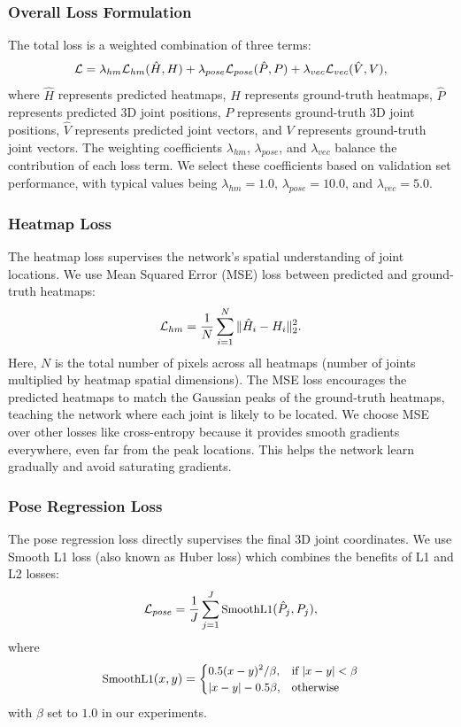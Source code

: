 \subsubsection{Overall Loss Formulation}
The total loss is a weighted combination of three terms:
\begin{equation}
\small
\mathcal{L} = \lambda_{hm}\mathcal{L}_{hm}(\hat{H}, H)
+ \lambda_{pose}\mathcal{L}_{pose}(\hat{P}, P)
+ \lambda_{vec}\mathcal{L}_{vec}(\hat{V}, V),
\end{equation}
where \(\hat{H}\) represents predicted heatmaps, \(H\) represents ground-truth heatmaps, \(\hat{P}\) represents predicted 3D joint positions, \(P\) represents ground-truth 3D joint positions, \(\hat{V}\) represents predicted joint vectors, and \(V\) represents ground-truth joint vectors. The weighting coefficients \(\lambda_{hm}\), \(\lambda_{pose}\), and \(\lambda_{vec}\) balance the contribution of each loss term. We select these coefficients based on validation set performance, with typical values being \(\lambda_{hm}=1.0\), \(\lambda_{pose}=10.0\), and \(\lambda_{vec}=5.0\).

\subsubsection{Heatmap Loss}
The heatmap loss supervises the network's spatial understanding of joint locations. We use Mean Squared Error (MSE) loss between predicted and ground-truth heatmaps:
\begin{equation}
\small
\mathcal{L}_{hm} = \frac{1}{N}\sum_{i=1}^{N} \|\hat{H}_i - H_i\|_2^2 .
\end{equation}
Here, \(N\) is the total number of pixels across all heatmaps (number of joints multiplied by heatmap spatial dimensions). The MSE loss encourages the predicted heatmaps to match the Gaussian peaks of the ground-truth heatmaps, teaching the network where each joint is likely to be located.
We choose MSE over other losses like cross-entropy because it provides smooth gradients everywhere, even far from the peak locations. This helps the network learn gradually and avoid saturating gradients.

\subsubsection{Pose Regression Loss}
The pose regression loss directly supervises the final 3D joint coordinates. We use Smooth L1 loss (also known as Huber loss) which combines the benefits of L1 and L2 losses:
\begin{equation}
\small
\mathcal{L}_{pose} = \frac{1}{J}\sum_{j=1}^{J} \text{SmoothL1}(\hat{P}_j, P_j),
\end{equation}
where
\begin{equation}
\small
\text{SmoothL1}(x, y) = 
\begin{cases}
0.5 (x - y)^2 / \beta, & \text{if } |x - y| < \beta \\
|x - y| - 0.5\beta, & \text{otherwise}
\end{cases}
\end{equation}
with \(\beta\) set to \(1.0\) in our experiments.

